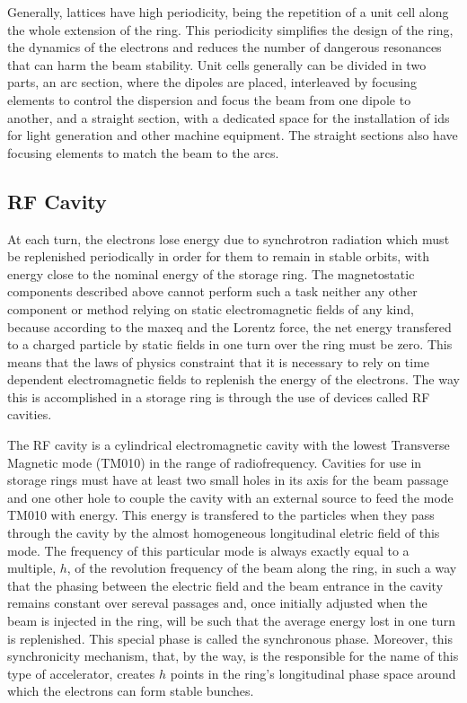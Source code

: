     Generally, lattices have high periodicity, being the repetition of a unit cell along the whole extension of the ring. This periodicity simplifies the design of the ring, the dynamics of the electrons and reduces the number of dangerous resonances that can harm the beam stability. Unit cells generally can be divided in two parts, an arc section, where the dipoles are placed, interleaved by focusing elements to control the dispersion and focus the beam from one dipole to another, and a straight section, with a dedicated space for the installation of \glspl{id} for light generation and other machine equipment. The straight sections also have focusing elements to match the beam to the arcs.

\subsection{RF Cavity}

    At each turn, the electrons lose energy due to synchrotron radiation which must be replenished periodically in order for them to remain in stable orbits, with energy close to the nominal energy of the storage ring. The magnetostatic components described above cannot perform such a task neither any other component or method relying on static electromagnetic fields of any kind, because according to the \gls{maxeq} and the Lorentz force, the net energy transfered to a charged particle by static fields in one turn over the ring must be zero. This means that the laws of physics constraint that it is necessary to rely on time dependent electromagnetic fields to replenish the energy of the electrons. The way this is accomplished in a storage ring is through the use of devices called RF cavities.

    The RF cavity is a cylindrical electromagnetic cavity with the lowest Transverse Magnetic mode (TM010) in the range of radiofrequency. Cavities for use in storage rings must have at least two small holes in its axis for the beam passage and one other hole to couple the cavity with an external source to feed the mode TM010 with energy. This energy is transfered to the particles when they pass through the cavity by the almost homogeneous longitudinal eletric field of this mode. The frequency of this particular mode is always exactly equal to a multiple, $h$, of the revolution frequency of the beam along the ring, in such a way that the phasing between the electric field and the beam entrance in the cavity remains constant over sereval passages and, once initially adjusted when the beam is injected in the ring, will be such that the average energy lost in one turn is replenished. This special phase is called the synchronous phase. Moreover, this synchronicity mechanism, that, by the way, is the responsible for the name of this type of accelerator, creates $h$ points in the ring's longitudinal phase space around which the electrons can form stable bunches.

